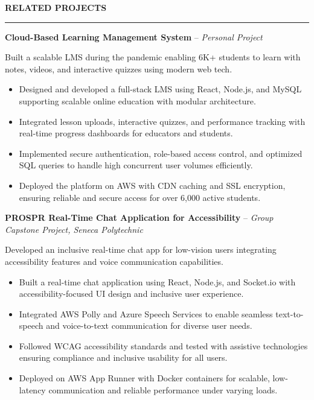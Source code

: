 \documentclass[10pt,letterpaper]{article}
\begin{document}
\vspace{6pt}

\textbf{RELATED PROJECTS}\\[-8pt]
\noindent\rule{\textwidth}{1pt}

\vspace{-2pt}

\textbf{Cloud-Based Learning Management System} -- \emph{Personal Project}

\vspace{-1pt}

Built a scalable LMS during the pandemic enabling 6K+ students to learn with notes, videos, and interactive quizzes using modern web tech.
\vspace{-1pt}
\begin{itemize}
\item Designed and developed a full-stack LMS using React, Node.js, and MySQL supporting scalable online education with modular architecture.
\item Integrated lesson uploads, interactive quizzes, and performance tracking with real-time progress dashboards for educators and students.
\item Implemented secure authentication, role-based access control, and optimized SQL queries to handle high concurrent user volumes efficiently.
\item Deployed the platform on AWS with CDN caching and SSL encryption, ensuring reliable and secure access for over 6,000 active students.
\end{itemize}

\textbf{PROSPR  Real-Time Chat Application for Accessibility} -- \emph{Group Capstone Project, Seneca Polytechnic}

\vspace{-1pt}

Developed an inclusive real-time chat app for low-vision users integrating accessibility features and voice communication capabilities.
\vspace{-1pt}
\begin{itemize}
\item Built a real-time chat application using React, Node.js, and Socket.io with accessibility-focused UI design and inclusive user experience.
\item Integrated AWS Polly and Azure Speech Services to enable seamless text-to-speech and voice-to-text communication for diverse user needs.
\item Followed WCAG accessibility standards and tested with assistive technologies ensuring compliance and inclusive usability for all users.
\item Deployed on AWS App Runner with Docker containers for scalable, low-latency communication and reliable performance under varying loads.
\end{itemize}
\end{document}
